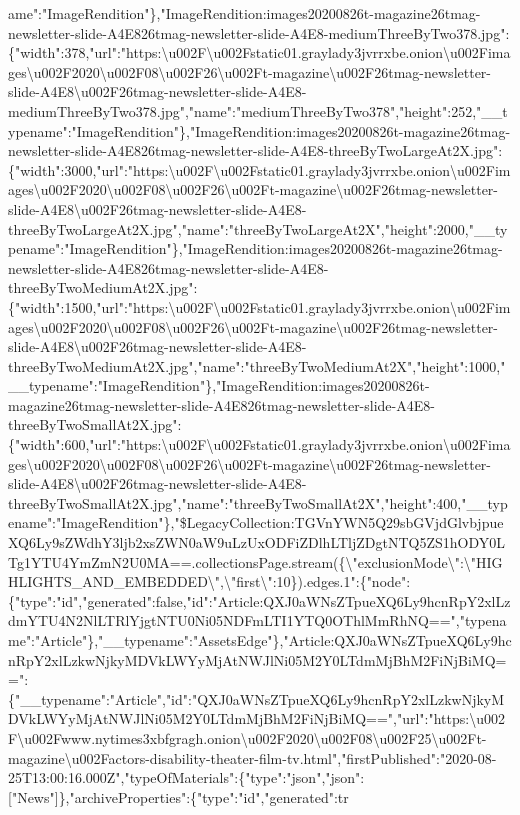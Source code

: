 ame":"ImageRendition"\},"ImageRendition:images20200826t-magazine26tmag-newsletter-slide-A4E826tmag-newsletter-slide-A4E8-mediumThreeByTwo378.jpg":\{"width":378,"url":"https:\textbackslash{}u002F\textbackslash{}u002Fstatic01.graylady3jvrrxbe.onion\textbackslash{}u002Fimages\textbackslash{}u002F2020\textbackslash{}u002F08\textbackslash{}u002F26\textbackslash{}u002Ft-magazine\textbackslash{}u002F26tmag-newsletter-slide-A4E8\textbackslash{}u002F26tmag-newsletter-slide-A4E8-mediumThreeByTwo378.jpg","name":"mediumThreeByTwo378","height":252,"\_\_typename":"ImageRendition"\},"ImageRendition:images20200826t-magazine26tmag-newsletter-slide-A4E826tmag-newsletter-slide-A4E8-threeByTwoLargeAt2X.jpg":\{"width":3000,"url":"https:\textbackslash{}u002F\textbackslash{}u002Fstatic01.graylady3jvrrxbe.onion\textbackslash{}u002Fimages\textbackslash{}u002F2020\textbackslash{}u002F08\textbackslash{}u002F26\textbackslash{}u002Ft-magazine\textbackslash{}u002F26tmag-newsletter-slide-A4E8\textbackslash{}u002F26tmag-newsletter-slide-A4E8-threeByTwoLargeAt2X.jpg","name":"threeByTwoLargeAt2X","height":2000,"\_\_typename":"ImageRendition"\},"ImageRendition:images20200826t-magazine26tmag-newsletter-slide-A4E826tmag-newsletter-slide-A4E8-threeByTwoMediumAt2X.jpg":\{"width":1500,"url":"https:\textbackslash{}u002F\textbackslash{}u002Fstatic01.graylady3jvrrxbe.onion\textbackslash{}u002Fimages\textbackslash{}u002F2020\textbackslash{}u002F08\textbackslash{}u002F26\textbackslash{}u002Ft-magazine\textbackslash{}u002F26tmag-newsletter-slide-A4E8\textbackslash{}u002F26tmag-newsletter-slide-A4E8-threeByTwoMediumAt2X.jpg","name":"threeByTwoMediumAt2X","height":1000,"\_\_typename":"ImageRendition"\},"ImageRendition:images20200826t-magazine26tmag-newsletter-slide-A4E826tmag-newsletter-slide-A4E8-threeByTwoSmallAt2X.jpg":\{"width":600,"url":"https:\textbackslash{}u002F\textbackslash{}u002Fstatic01.graylady3jvrrxbe.onion\textbackslash{}u002Fimages\textbackslash{}u002F2020\textbackslash{}u002F08\textbackslash{}u002F26\textbackslash{}u002Ft-magazine\textbackslash{}u002F26tmag-newsletter-slide-A4E8\textbackslash{}u002F26tmag-newsletter-slide-A4E8-threeByTwoSmallAt2X.jpg","name":"threeByTwoSmallAt2X","height":400,"\_\_typename":"ImageRendition"\},"\$LegacyCollection:TGVnYWN5Q29sbGVjdGlvbjpueXQ6Ly9sZWdhY3ljb2xsZWN0aW9uLzUxODFiZDlhLTljZDgtNTQ5ZS1hODY0LTg1YTU4YmZmN2U0MA==.collectionsPage.stream(\{\textbackslash{}"exclusionMode\textbackslash{}":\textbackslash{}"HIGHLIGHTS\_AND\_EMBEDDED\textbackslash{}",\textbackslash{}"first\textbackslash{}":10\}).edges.1":\{"node":\{"type":"id","generated":false,"id":"Article:QXJ0aWNsZTpueXQ6Ly9hcnRpY2xlLzdmYTU4N2NlLTRlYjgtNTU0Ni05NDFmLTI1YTQ0OThlMmRhNQ==","typename":"Article"\},"\_\_typename":"AssetsEdge"\},"Article:QXJ0aWNsZTpueXQ6Ly9hcnRpY2xlLzkwNjkyMDVkLWYyMjAtNWJlNi05M2Y0LTdmMjBhM2FiNjBiMQ==":\{"\_\_typename":"Article","id":"QXJ0aWNsZTpueXQ6Ly9hcnRpY2xlLzkwNjkyMDVkLWYyMjAtNWJlNi05M2Y0LTdmMjBhM2FiNjBiMQ==","url":"https:\textbackslash{}u002F\textbackslash{}u002Fwww.nytimes3xbfgragh.onion\textbackslash{}u002F2020\textbackslash{}u002F08\textbackslash{}u002F25\textbackslash{}u002Ft-magazine\textbackslash{}u002Factors-disability-theater-film-tv.html","firstPublished":"2020-08-25T13:00:16.000Z","typeOfMaterials":\{"type":"json","json":{[}"News"{]}\},"archiveProperties":\{"type":"id","generated":tr